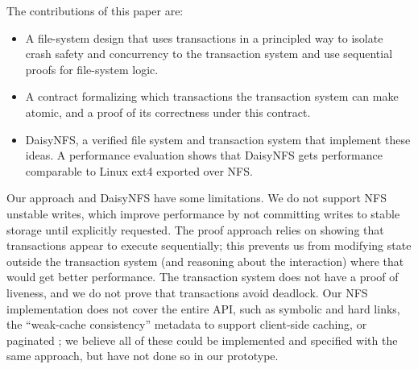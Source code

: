 The contributions of this paper are:
\begin{itemize}
  \item A file-system design that uses transactions in a principled way to
  isolate crash safety and concurrency to the transaction system and use
  sequential proofs for file-system logic.
  \item A contract formalizing which transactions the transaction system can
  make atomic, and a proof of its correctness under this contract.
  \item DaisyNFS, a verified file system and transaction system that implement
  these ideas. A performance evaluation shows that DaisyNFS gets performance
  comparable to Linux ext4 exported over NFS.
\end{itemize}

Our approach and DaisyNFS have some limitations. We do not support NFS unstable
writes, which improve performance by not committing writes to stable storage
until explicitly requested. The proof approach relies on showing that
transactions appear to execute sequentially; this prevents us from modifying state
outside the transaction system (and reasoning about the interaction) where that
would get better performance. The transaction system does not have a proof of
liveness, and we do not prove that transactions avoid deadlock. Our NFS
implementation does not cover the entire API, such as symbolic and hard links,
the ``weak-cache consistency'' metadata to support client-side caching, or
paginated ; we believe all of these could be implemented and
specified with the same approach, but have not done so in our prototype.
